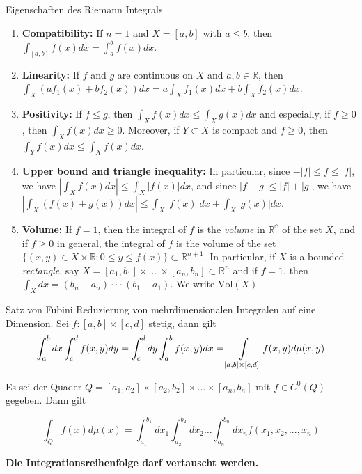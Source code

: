 \begin{Satz}{Eigenschaften des Riemann Integrals}{}
    \begin{enumerate}
        \def\labelenumi{\arabic{enumi}.}
        \item
          \textbf{Compatibility:} If \textbf{\(n=1\)} and \(X=[a,b]\) with
          \(a\leq b\), then \(\int_{[a,b]}f(x)dx=\int_a^bf(x)dx\).
        \item
          \textbf{Linearity:} If \(f\) and \(g\) are continuous on \(X\) and
          \(a,b \in \mathbb{R}\), then
          \(\int_X(af_1(x)+bf_2(x))dx = a\int_Xf_1(x)dx+b\int_Xf_2(x)dx\).
        \item
          \textbf{Positivity:} If \(f\leq g\), then
          \(\int_Xf(x)dx\leq\int_Xg(x)dx\) and especially, if \(f \geq 0\), then
          \(\int_Xf(x)dx \geq 0\). Moreover, if \(Y \subset X\) is compact and
          \(f\geq 0\), then \(\int_Yf(x)dx\leq\int_Xf(x)dx\).
        \item
          \textbf{Upper bound and triangle inequality:} In particular, since
          \(-|f|\leq f \leq |f|\), we have
          \(\left| \int_Xf(x)dx \right| \leq \int_X|f(x)|dx\), and since
          \(|f+g| \leq |f| + |g|\), we have
          \(\left| \int_X(f(x)+g(x))dx \right| \leq \int_X|f(x)|dx + \int_X|g(x)|dx\).
        \item
          \textbf{Volume:} If \(f=1\), then the integral of \(f\) is the
          \emph{volume} in \(\mathbb{R^n}\) of the set \(X\), and if \(f\geq 0\)
          in general, the integral of \(f\) is the volume of the set
          \(\{(x,y) \in X \times \mathbb{R} : 0 \leq y \leq f(x)\} \subset \mathbb{R}^{n+1}\).
          In particular, if \(X\) is a bounded \emph{rectangle}, say
          \(X = [a_1,b_1] \times ... \ \times [a_n, b_n] \subset \mathbb{R}^n\)
          and if \(f=1\), then \(\int_Xdx=(b_n-a_n) \cdot\cdot\cdot(b_1-a_1)\).
          We write $\text{Vol}(X)$
        \end{enumerate}
  
\end{Satz}
\begin{Satz}{Satz von Fubini}{}
    Reduzierung von mehrdimensionalen Integralen auf eine Dimension. Sei $f: [a,b] \times [c, d]$ stetig, dann gilt
    \[ \int_a^b dx \int_c^d f(x, y) dy = \int_c^d dy \int_a^b f(x, y) dx = \int\displaylimits_{[a,b] \times [c, d]} f(x, y) d\mu(x, y)   \]

    Es sei der Quader $Q = [a_1,a_2] \times [a_2, b_2] \times \dots \times [a_n, b_n]$ mit $f \in C^0(Q)$ gegeben. Dann gilt

    \[
        \int_Q f(x) d\mu(x) = \int_{a_1}^{b_1} dx_1 \int_{a_2}^{b_2} dx_2 \dots \int_{a_n}^{b_n} dx_n f(x_1, x_2,...,x_n)
    \]
    
    \textbf{Die Integrationsreihenfolge darf vertauscht werden.}
\end{Satz}

